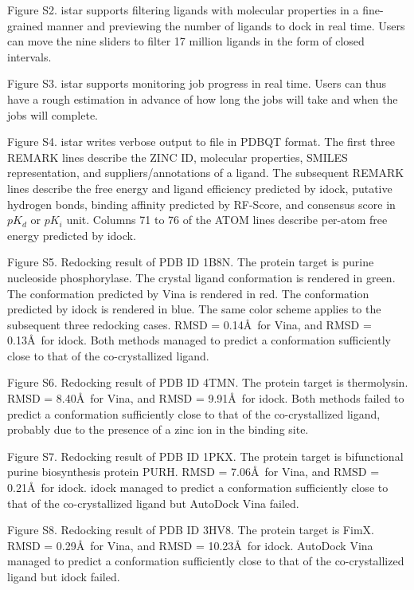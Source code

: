 \documentclass[10pt]{article}
\begin{document}
Figure S2. istar supports filtering ligands with molecular properties in a fine-grained manner and previewing the number of ligands to dock in real time. Users can move the nine sliders to filter 17 million ligands in the form of closed intervals.

Figure S3. istar supports monitoring job progress in real time. Users can thus have a rough estimation in advance of how long the jobs will take and when the jobs will complete.

Figure S4. istar writes verbose output to file in PDBQT format. The first three REMARK lines describe the ZINC ID, molecular properties, SMILES representation, and suppliers/annotations of a ligand. The subsequent REMARK lines describe the free energy and ligand efficiency predicted by idock, putative hydrogen bonds, binding affinity predicted by RF-Score, and consensus score in $pK_d$ or $pK_i$ unit. Columns 71 to 76 of the ATOM lines describe per-atom free energy predicted by idock.

Figure S5. Redocking result of PDB ID 1B8N. The protein target is purine nucleoside phosphorylase. The crystal ligand conformation is rendered in green. The conformation predicted by Vina is rendered in red. The conformation predicted by idock is rendered in blue. The same color scheme applies to the subsequent three redocking cases. RMSD = 0.14\AA\ for Vina, and RMSD = 0.13\AA\ for idock. Both methods managed to predict a conformation sufficiently close to that of the co-crystallized ligand.

Figure S6. Redocking result of PDB ID 4TMN. The protein target is thermolysin. RMSD = 8.40\AA\ for Vina, and RMSD = 9.91\AA\ for idock. Both methods failed to predict a conformation sufficiently close to that of the co-crystallized ligand, probably due to the presence of a zinc ion in the binding site.

Figure S7. Redocking result of PDB ID 1PKX. The protein target is bifunctional purine biosynthesis protein PURH. RMSD = 7.06\AA\ for Vina, and RMSD = 0.21\AA\ for idock. idock managed to predict a conformation sufficiently close to that of the co-crystallized ligand but AutoDock Vina failed.

Figure S8. Redocking result of PDB ID 3HV8. The protein target is FimX. RMSD = 0.29\AA\ for Vina, and RMSD = 10.23\AA\ for idock. AutoDock Vina managed to predict a conformation sufficiently close to that of the co-crystallized ligand but idock failed.
\end{document}
